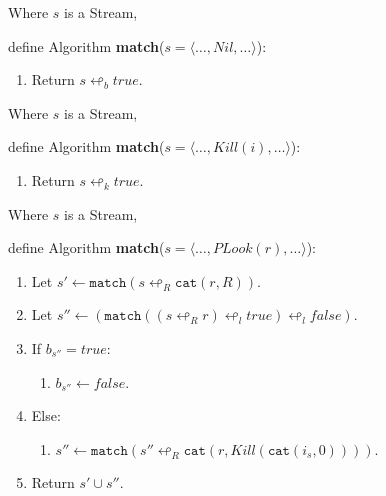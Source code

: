 \begin{framed}
  Where $s$ is a Stream,

 \vspace{12pt} 
 define Algorithm \textbf{match}($s=\langle \ldots, Nil, \ldots \rangle$):

 \begin{enumerate}
     \item Return $s \looparrowleft_b true$.
 \end{enumerate}

\end{framed}


\begin{framed}
  Where $s$ is a Stream,

 \vspace{12pt} 
 define Algorithm \textbf{match}($s=\langle \ldots, Kill(i), \ldots \rangle$):

 \begin{enumerate}
    \item Return $s \looparrowleft_k true$.
 \end{enumerate}

\end{framed}

\begin{framed}
  Where $s$ is a Stream,

 \vspace{12pt} 
 define Algorithm \textbf{match}($s=\langle \ldots, PLook(r), \ldots \rangle$):

    \begin{enumerate} 
     \item Let $s'  \leftarrow \texttt{match}( s \looparrowleft_R \texttt{cat}(r, R) )$.
     \item Let $s'' \leftarrow (\texttt{match}( (s \looparrowleft_R r) \looparrowleft_l true ) \looparrowleft_l false)$.
     \item If $b_{s''} = true$:
     \begin{enumerate} 
       \item $b_{s''} \leftarrow false$. 
     \end{enumerate} 
    \item Else:
     \begin{enumerate} 
       \item $s'' \leftarrow \texttt{match}(s'' \looparrowleft_R \texttt{cat}(r, Kill(\texttt{cat}(i_s, 0))))$.
     \end{enumerate} 
     \item Return $s' \cup s''$.
 \end{enumerate}

\end{framed}


